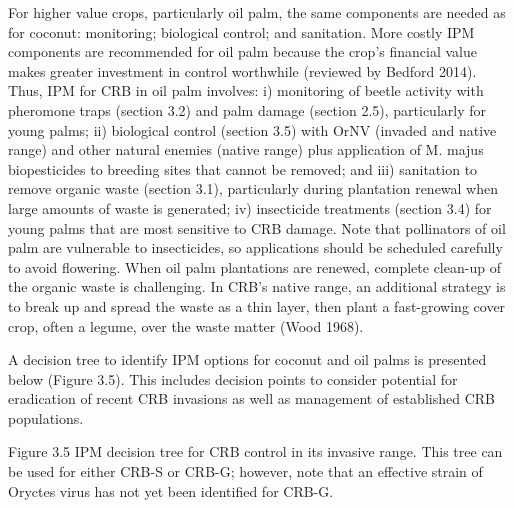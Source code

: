 \documentclass[twocolumn,letterpaper]{scrartcl}
\begin{document}
For higher value crops, particularly oil palm, the same components are needed as for coconut: monitoring; 
biological control; and sanitation. More costly IPM components are recommended for oil palm because the 
crop’s financial value makes greater investment in control worthwhile (reviewed by Bedford 2014). Thus, IPM for 
CRB in oil palm involves: i) monitoring of beetle activity with pheromone traps (section 3.2) and palm damage 
(section 2.5), particularly for young palms; ii) biological control (section 3.5) with OrNV (invaded and native 
range) and other natural enemies (native range) plus application of M. majus biopesticides to breeding sites 
that cannot be removed; and iii) sanitation to remove organic waste (section 3.1), particularly during plantation 
renewal when large amounts of waste is generated; iv) insecticide treatments (section 3.4) for young palms that 
are most sensitive to CRB damage. Note that pollinators of oil palm are vulnerable to insecticides, so applications 
should be scheduled carefully to avoid flowering. When oil palm plantations are renewed, complete clean-up 
of the organic waste is challenging. In CRB’s native range, an additional strategy is to break up and spread the 
waste as a thin layer, then plant a fast-growing cover crop, often a legume, over the waste matter (Wood 1968). 

A decision tree to identify IPM options for coconut and oil palms is presented below (Figure 3.5). This includes 
decision  points  to  consider  potential  for  eradication  of  recent  CRB  invasions  as  well  as  management  of 
established CRB populations. 

Figure 3.5   IPM decision tree for CRB control in its invasive range. This tree can be used for either CRB-S  
or CRB-G; however, note that an effective strain of Oryctes virus has not yet been identified for CRB-G. 



\nocite{jackson_coconut_2020}


\printbibliography
\end{document}
